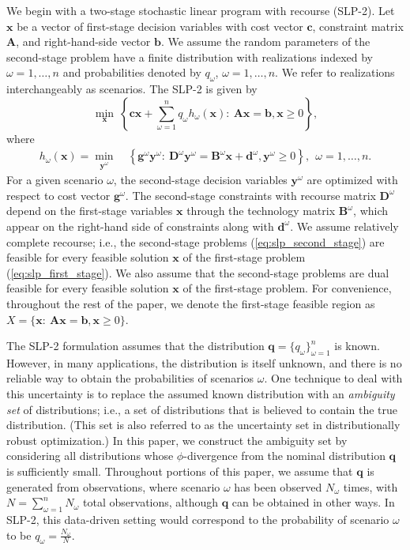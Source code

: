 \documentclass[opre,nonblindrev]{informs3} %
\newcommand{\x}{\mathbf{x}}
\newcommand{\y}{\mathbf{y}}
\renewcommand{\c}{\mathbf{c}}
\newcommand{\A}{\mathbf{A}}
\renewcommand{\b}{\mathbf{b}}
\newcommand{\g}{\mathbf{g}}
\newcommand{\D}{\mathbf{D}}
\newcommand{\B}{\mathbf{B}}
\renewcommand{\d}{\mathbf{d}}
\newcommand{\q}{\mathbf{q}}
\begin{document}
We begin with a two-stage stochastic linear program with recourse (SLP-2).
Let $\x$ be a vector of first-stage decision variables with cost vector $\c$, constraint matrix $\A$, and right-hand-side vector $\b$.
We assume the random parameters of the second-stage problem have a finite distribution with realizations indexed by $\omega = 1, \dots, n$ and probabilities denoted by $q_\omega$,  $\omega = 1, \dots, n$. 
We refer to realizations interchangeably as scenarios. 
The SLP-2 is given by
\begin{equation}
	\min_\x \ \left\{ \c\x + \sum_{\omega=1}^n q_\omega h_\omega(\x) : \ \A\x = \b, \x \geq 0 \right\}, \label{eq:slp_first_stage}
\end{equation}
where
\begin{align}
	h_\omega(\x) = \min_{\y^\omega} \ & \left\{ \g^\omega \y^\omega : \  \D^\omega \y^\omega = \B^\omega \x + \d^\omega, \y^\omega \geq 0 \right\}, \ \   \omega = 1, \dots, n. \label{eq:slp_second_stage}
\end{align}
For a given scenario $\omega$, the second-stage decision variables $\y^\omega$ are optimized with respect to cost vector $\g^{\omega}$. 
The second-stage constraints with recourse matrix $\D^{\omega}$ depend on the first-stage variables $\x$ through the technology matrix $\B^{\omega}$, which appear on the right-hand side of constraints along with $\d^{\omega}$. 
We assume relatively complete recourse; i.e., the second-stage problems (\ref{eq:slp_second_stage}) are feasible for every feasible solution $\x$ of the first-stage problem (\ref{eq:slp_first_stage}). 
We also assume that the second-stage problems are dual feasible for every feasible solution $\x$ of the first-stage problem.
For convenience, throughout the rest of the paper, we denote the first-stage feasible region as $X = \{\x : \ \A\x = \b, \x \geq 0\}$.

The SLP-2 formulation assumes that the distribution $\q =\{q_\omega\}_{\omega=1}^n$ is known.
However, in many applications, the distribution is itself unknown, and there is no reliable way to obtain the probabilities of scenarios $\omega$.
One technique to deal with this uncertainty is to replace the assumed known distribution with an {\it ambiguity set} of distributions; i.e., a set of distributions that is believed to contain the true distribution.
(This set is also referred to as the uncertainty set in distributionally robust optimization.)
In this paper, we construct the ambiguity set by considering all distributions whose $\phi$-divergence from the nominal distribution $\q$ is sufficiently small.
Throughout portions of this paper, we assume that $\q$ is generated from observations, where scenario $\omega$ has been observed $N_\omega$ times, with $N = \sum_{\omega=1}^n N_\omega$ total observations, although $\q$ can be obtained in other ways.
In SLP-2, this data-driven setting would correspond to the probability of scenario $\omega$ to be $q_\omega = \frac{N_\omega}{N}$.
\end{document}
